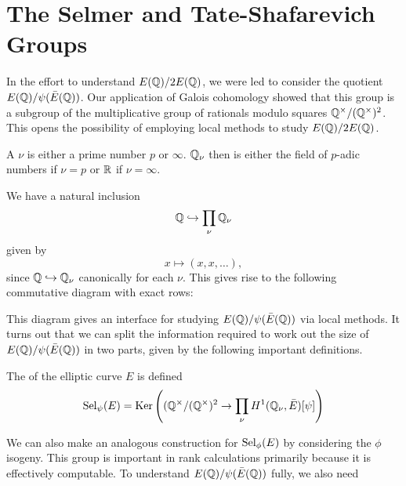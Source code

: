 \documentclass[12pt, a4paper]{report}
\begin{document}
\section{The Selmer and Tate-Shafarevich Groups}

In the effort to understand $E({\mathbb Q})/2E({\mathbb Q})$, we were led to consider the quotient
$E({\mathbb Q}) / \psi(\bar{E}({\mathbb Q}))$. Our application of Galois cohomology showed that this
group is a subgroup of the multiplicative group of rationals modulo squares
${\mathbb Q}^{\times} / ({\mathbb Q}^{\times})^2$. This opens the possibility of employing local
methods to study $E({\mathbb Q})/2E({\mathbb Q})$.

\begin{defn}
  A  $\nu$ is either a prime number $p$ or $\infty$. ${\mathbb Q}_\nu$ then is
  either the field of $p$-adic numbers if $\nu = p$ or ${\mathbb R}$ if $\nu = \infty$.
\end{defn}

We have a natural inclusion 
$${\mathbb Q} \hookrightarrow \prod\limits_\nu {\mathbb Q}_\nu$$
given by
$$x \mapsto (x, x, \dots),$$ 
since ${\mathbb Q} \hookrightarrow {\mathbb Q}_{\nu}$ canonically for each
$\nu$. This gives rise to the following commutative diagram with exact rows:


This diagram gives an interface for studying $E({\mathbb Q})/\psi(\bar{E}({\mathbb Q}))$ via
local methods. It turns out that we can split the information required to work
out the size of $E({\mathbb Q})/\psi(\bar{E}({\mathbb Q}))$ in two parts, given by the following
important definitions.

\begin{defn}
  The  of the elliptic curve $E$ is defined
  $$\text{\normalfont Sel}_\psi(E) = \text{Ker}\left(({\mathbb Q}^{\times}/({\mathbb Q}^{\times})^2 \rightarrow
  \prod\limits_\nu H^1({\mathbb Q}_\nu, \bar{E})[\psi]\right)$$
\end{defn}

We can also make an analogous construction for $\text{\normalfont Sel}_\phi(E)$ by
considering the $\phi$ isogeny. 
This group is important in rank calculations primarily because it is effectively
computable. To understand $E({\mathbb Q})/\psi(\bar{E}({\mathbb Q}))$ fully, we also need
\end{document}
